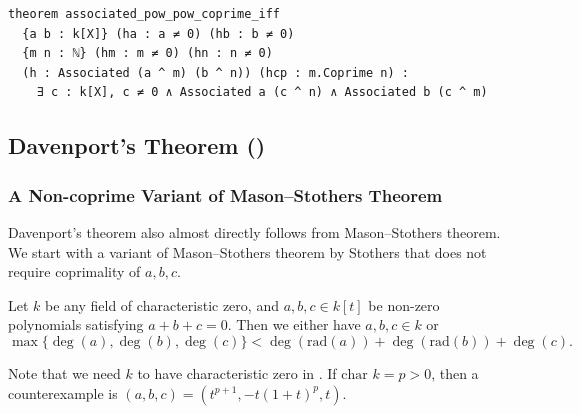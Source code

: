 \documentclass[runningheads]{llncs}
\newcommand{\rad}{\mathrm{rad}}
\begin{document}
\begin{verbatim}
theorem associated_pow_pow_coprime_iff
  {a b : k[X]} (ha : a ≠ 0) (hb : b ≠ 0)
  {m n : ℕ} (hm : m ≠ 0) (hn : n ≠ 0)
  (h : Associated (a ^ m) (b ^ n)) (hcp : m.Coprime n) :
    ∃ c : k[X], c ≠ 0 ∧ Associated a (c ^ n) ∧ Associated b (c ^ m)
\end{verbatim}



\subsection{Davenport's Theorem ()}
\label{subsec:pf-davenport}

\subsubsection{A Non-coprime Variant of Mason--Stothers Theorem}

Davenport's theorem also almost directly follows from Mason--Stothers theorem.
We start with a variant of Mason--Stothers theorem by Stothers \cite{stothers81} that does not require coprimality of $a, b, c$.

\begin{theorem}
\label{thm:mason-stothers-nocoprime}
Let $k$ be any field of characteristic zero, and $a, b, c \in k[t]$ be non-zero polynomials satisfying $a + b + c = 0$.
Then we either have $a, b, c \in k$ or
\[
\max\{\deg(a), \deg(b), \deg(c)\} < \deg (\rad(a)) + \deg (\rad(b)) + \deg (c).
\]
\end{theorem}

Note that we need $k$ to have characteristic zero in . If $\textrm{char } k = p > 0$, then a counterexample is $(a, b, c) = (t^{p+1}, -t(1 + t)^p, t)$.
\end{document}
